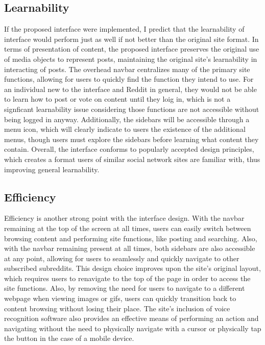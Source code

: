 \documentclass{article}
\begin{document}
\subsection{Learnability} If the proposed interface were implemented, I predict that the learnability of interface would perform just as well if not better than the original site format. In terms of presentation of content, the proposed interface preserves the original use of media objects to represent posts, maintaining the original site's learnability in interacting of posts. The overhead navbar centralizes many of the primary site functions, allowing for users to quickly find the function they intend to use. For an individual new to the interface and Reddit in general, they would not be able to learn how to post or vote on content until they loig in, which is not a signficant learnability issue considering those functions are not accessible without being logged in anyway. Additionally, the sidebars will be accessible through a menu icon, which will clearly indicate to users the existence of the additional menus, though users must explore the sidebars before learning what content they contain. Overall, the interface conforms to popularly accepted design principles, which creates a format users of similar social network sites are familiar with, thus improving general learnability.

\subsection{Efficiency} Efficiency is another strong point with the interface design. With the navbar remaining at the top of the screen at all times, users can easily switch between browsing content and performing site functions, like posting and searching. Also, with the navbar remaining present at all times, both sidebars are also accessible at any point, allowing for users to seamlessly and quickly navigate to other subscribed subreddits. This design choice improves upon the site's original layout, which requires users to renavigate to the top of the page in order to access the site functions. Also, by removing the need for users to navigate to a different webpage when viewing images or gifs, users can quickly transition back to content browsing without losing their place. The site's inclusion of voice recognition software also provides an effective means of performing an action and navigating without the need to physically navigate with a cursor or physically tap the button in the case of a mobile device.
\end{document}
